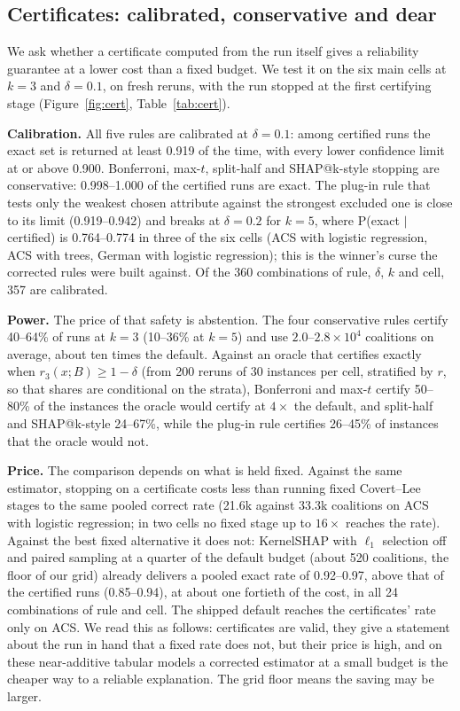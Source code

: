 \subsection{Certificates: calibrated, conservative and dear}
\label{sec:exp-cert}

We ask whether a certificate computed from the run itself gives a reliability guarantee at a lower cost than a fixed budget. We test it on the six main cells at $k=3$ and $\delta=0.1$, on fresh reruns, with the run stopped at the first certifying stage (Figure~\ref{fig:cert}, Table~\ref{tab:cert}).

\textbf{Calibration.}
All five rules are calibrated at $\delta=0.1$: among certified runs the exact set is returned at least 0.919 of the time, with every lower confidence limit at or above 0.900. Bonferroni, max-$t$, split-half and SHAP@k-style stopping are conservative: 0.998--1.000 of the certified runs are exact. The plug-in rule that tests only the weakest chosen attribute against the strongest excluded one is close to its limit (0.919--0.942) and breaks at $\delta=0.2$ for $k=5$, where P(exact $\mid$ certified) is 0.764--0.774 in three of the six cells (ACS with logistic regression, ACS with trees, German with logistic regression); this is the winner's curse the corrected rules were built against. Of the 360 combinations of rule, $\delta$, $k$ and cell, 357 are calibrated.

\textbf{Power.}
The price of that safety is abstention. The four conservative rules certify 40--64\% of runs at $k=3$ (10--36\% at $k=5$) and use $2.0$--$2.8\times10^{4}$ coalitions on average, about ten times the default. Against an oracle that certifies exactly when $r_3(x;B)\ge 1-\delta$ (from 200 reruns of 30 instances per cell, stratified by $r$, so that shares are conditional on the strata), Bonferroni and max-$t$ certify 50--80\% of the instances the oracle would certify at $4\times$ the default, and split-half and SHAP@k-style 24--67\%, while the plug-in rule certifies 26--45\% of instances that the oracle would not.

\textbf{Price.}
The comparison depends on what is held fixed. Against the same estimator, stopping on a certificate costs less than running fixed Covert--Lee stages to the same pooled correct rate (21.6k against 33.3k coalitions on ACS with logistic regression; in two cells no fixed stage up to $16\times$ reaches the rate). Against the best fixed alternative it does not: KernelSHAP with $\ell_1$ selection off and paired sampling at a quarter of the default budget (about 520 coalitions, the floor of our grid) already delivers a pooled exact rate of 0.92--0.97, above that of the certified runs (0.85--0.94), at about one fortieth of the cost, in all 24 combinations of rule and cell. The shipped default reaches the certificates' rate only on ACS. We read this as follows: certificates are valid, they give a statement about the run in hand that a fixed rate does not, but their price is high, and on these near-additive tabular models a corrected estimator at a small budget is the cheaper way to a reliable explanation. The grid floor means the saving may be larger.

